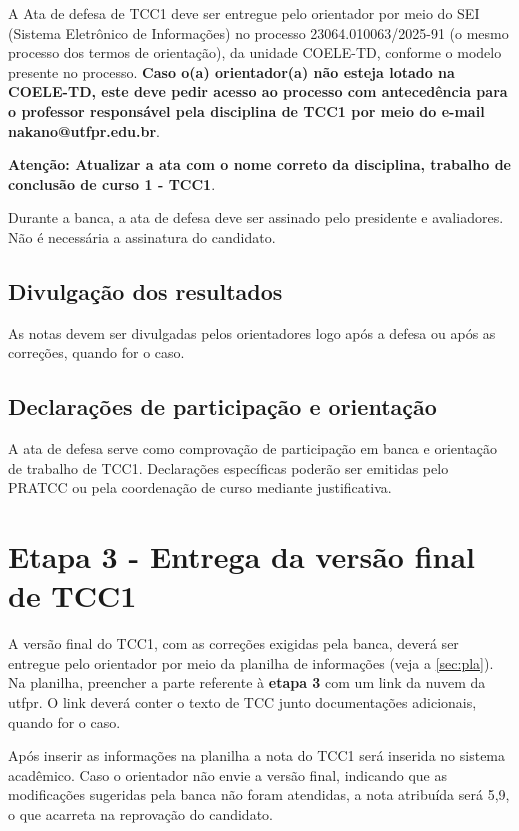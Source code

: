 \documentclass[a4paper, 12pt]{article}
\newcommand{\seiprocess}{23064.010063/2025-91} %
\begin{document}
	A Ata de defesa de TCC1 deve ser entregue pelo orientador por meio do SEI (Sistema Eletrônico de Informações) no processo \seiprocess{} (o mesmo processo dos termos de orientação), da unidade COELE-TD, conforme o modelo presente no processo. \textbf{Caso o(a) orientador(a) não esteja lotado na COELE-TD, este deve pedir acesso ao processo com antecedência para o professor responsável pela disciplina de TCC1 por meio do e-mail nakano@utfpr.edu.br}.

	\textbf{Atenção: Atualizar a ata com o nome correto da disciplina, trabalho de conclusão de curso 1 - TCC1}.

	Durante a banca, a ata de defesa deve ser assinado pelo presidente e avaliadores. Não é necessária a assinatura do candidato.	
	
	\subsection{Divulgação dos resultados}
	
	As notas devem ser divulgadas pelos orientadores logo após a defesa ou após as correções, quando for o caso.

	\subsection{Declarações de participação e orientação}

	A ata de defesa serve como comprovação de participação em banca e orientação de trabalho de TCC1. Declarações específicas poderão ser emitidas pelo PRATCC ou pela coordenação de curso mediante justificativa.	
		
	\section{Etapa 3 - Entrega da versão final de TCC1}	
		
	A versão final do TCC1, com as correções exigidas pela banca, deverá ser entregue pelo orientador por meio da planilha de informações (veja a \autoref{sec:pla}). Na planilha, preencher a parte referente à \textbf{etapa 3} com um link da nuvem da utfpr. O link deverá conter o texto de TCC junto documentações adicionais, quando for o caso.	
			
	Após inserir as informações na planilha a nota do TCC1 será inserida no sistema acadêmico. Caso o orientador não envie a versão final, indicando que as modificações sugeridas pela banca não foram atendidas, a nota atribuída será 5,9, o que acarreta na reprovação do candidato.
\end{document}
